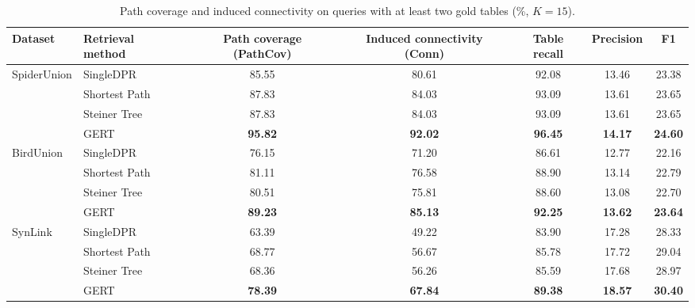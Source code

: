 \begin{table}[t]
  \centering
  \caption{Path coverage and induced connectivity on queries with at least two gold tables (\%, $K=15$).}
  \label{tab:connectivity-pathcov}
  \vspace{-0.8em}
  \begin{tabular*}{\linewidth}{@{\extracolsep{\fill}}llccccc}
    \toprule
    Dataset & Retrieval method & Path coverage (PathCov) & Induced connectivity (Conn) & Table recall & Precision & F1 \\
    \midrule
    \multirow{4}{*}{SpiderUnion} & SingleDPR & 85.55 & 80.61 & 92.08 & 13.46 & 23.38 \\
     & Shortest Path & 87.83 & 84.03 & 93.09 & 13.61 & 23.65 \\
     & Steiner Tree & 87.83 & 84.03 & 93.09 & 13.61 & 23.65 \\
     & GERT & \textbf{95.82} & \textbf{92.02} & \textbf{96.45} & \textbf{14.17} & \textbf{24.60} \\
    \midrule
    \multirow{4}{*}{BirdUnion} & SingleDPR & 76.15 & 71.20 & 86.61 & 12.77 & 22.16 \\
     & Shortest Path & 81.11 & 76.58 & 88.90 & 13.14 & 22.79 \\
     & Steiner Tree & 80.51 & 75.81 & 88.60 & 13.08 & 22.70 \\
     & GERT & \textbf{89.23} & \textbf{85.13} & \textbf{92.25} & \textbf{13.62} & \textbf{23.64} \\
    \midrule
    \multirow{4}{*}{SynLink} & SingleDPR & 63.39 & 49.22 & 83.90 & 17.28 & 28.33 \\
     & Shortest Path & 68.77 & 56.67 & 85.78 & 17.72 & 29.04 \\
     & Steiner Tree & 68.36 & 56.26 & 85.59 & 17.68 & 28.97 \\
     & GERT & \textbf{78.39} & \textbf{67.84} & \textbf{89.38} & \textbf{18.57} & \textbf{30.40} \\
    \bottomrule
  \end{tabular*}
\end{table}